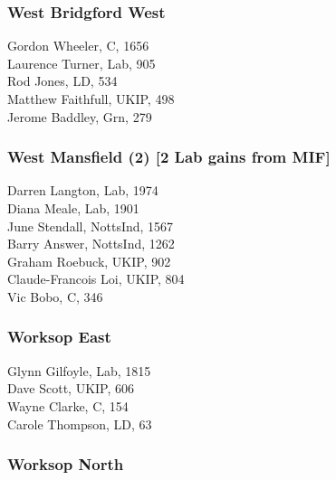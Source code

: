 \documentclass[a4paper,openany,10pt]{book}
\begin{document}
\subsubsection*{West Bridgford West}



Gordon Wheeler, C, 1656\\
Laurence Turner, Lab, 905\\
Rod Jones, LD, 534\\
Matthew Faithfull, UKIP, 498\\
Jerome Baddley, Grn, 279\\


\subsubsection*{West Mansfield (2) \hspace*{\fill}\nolinebreak[1]%
\enspace\hspace*{\fill}
[2 Lab gains from MIF]}



Darren Langton, Lab, 1974\\
Diana Meale, Lab, 1901\\
June Stendall, NottsInd, 1567\\
Barry Answer, NottsInd, 1262\\
Graham Roebuck, UKIP, 902\\
{Claude-Francois Loi}, UKIP, 804\\
Vic Bobo, C, 346\\


\subsubsection*{Worksop East}



Glynn Gilfoyle, Lab, 1815\\
Dave Scott, UKIP, 606\\
Wayne Clarke, C, 154\\
Carole Thompson, LD, 63\\


\subsubsection*{Worksop North}
\end{document}
